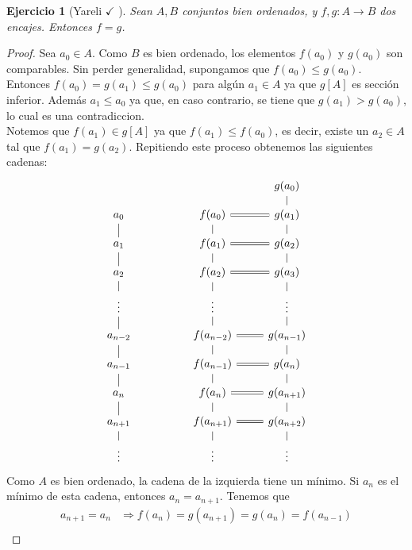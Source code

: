 \documentclass[12pt,letterpaper,titlepage]{article}
\newtheorem{exe}{Ejercicio}
\theoremstyle{definition}
\newcommand\<{\langle}
\renewcommand\>{\rangle}
\begin{document}
\begin{exe}[Yareli $\checkmark$ ]
  Sean $A, B$ conjuntos bien ordenados, y $f,g:A\to B$ dos encajes. Entonces $f=g$.
\end{exe}
\begin{proof}
Sea $a_0\in A$. Como $B$ es bien ordenado, los elementos $f(a_0)$ y $g(a_0)$ son comparables. Sin perder generalidad, supongamos que $f(a_0)\leq g(a_0)$.\\
Entonces $f(a_0)=g(a_1)\leq g(a_0)$ para algún $a_1\in A$ ya que $g[A]$ es sección inferior. Además $a_1\leq a_0$ ya que, en caso contrario, se tiene que $g(a_1)>g(a_0)$, lo cual es una contradiccion.\\
Notemos que $f(a_1)\in g[A]$ ya que $f(a_1)\leq f(a_0)$, es decir, existe un $a_2\in A$ tal que $f(a_1)=g(a_2)$. Repitiendo este proceso obtenemos las siguientes cadenas:
\[
\begin{tikzcd}[row sep=3mm]
                  &  &                                & g(a_0)               \\
a_0               &  & f(a_0) \arrow[r,equal]               & g(a_1) \arrow[u,no head]     \\
a_1 \arrow[u,no head]     &  & f(a_1) \arrow[u,no head] \arrow[r,equal]     & g(a_2) \arrow[u,no head]     \\
a_2 \arrow[u,no head]     &  & f(a_2) \arrow[u,no head] \arrow[r,equal]     & g(a_3) \arrow[u,no head]     \\
\vdots \arrow[u,no head]  &  & \vdots \arrow[u,no head]               & \vdots \arrow[u,no head]     \\
a_{n-2} \arrow[u,no head] &  & f(a_{n-2}) \arrow[u,no head] \arrow[r,equal] & g(a_{n-1}) \arrow[u,no head] \\
a_{n-1} \arrow[u,no head] &  & f(a_{n-1}) \arrow[u,no head] \arrow[r,equal] & g(a_n) \arrow[u,no head]     \\
a_{n} \arrow[u,no head]   &  & f(a_n) \arrow[u,no head] \arrow[r,equal]     & g(a_{n+1}) \arrow[u,no head] \\
a_{n+1} \arrow[u,no head] &  & f(a_{n+1}) \arrow[u,no head] \arrow[r,equal] & g(a_{n+2}) \arrow[u,no head] \\
\vdots \arrow[u,no head]  &  & \vdots \arrow[u,no head]               & \vdots \arrow[u,no head]    
\end{tikzcd}
\]
Como $A$ es bien ordenado, la cadena de la izquierda tiene un mínimo. Si $a_n$ es el mínimo de esta cadena, entonces $a_n=a_{n+1}$.
Tenemos que
\begin{align*}
a_{n+1}=a_n&\Rightarrow f(a_n)=g(a_{n+1})=g(a_n)=f(a_{n-1})\\

\end{align*}
\end{proof}
\end{document}
